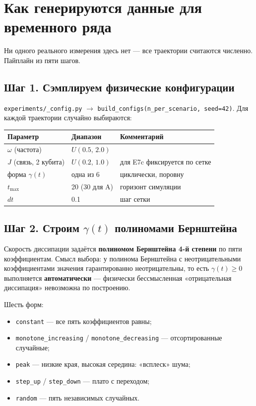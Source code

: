 \documentclass[12pt,a4paper]{article}
\newcommand{\code}[1]{\texttt{#1}}
\begin{document}
\section{Как генерируются данные для временного ряда}

Ни одного реального измерения здесь нет — все траектории считаются численно.
Пайплайн из пяти шагов.

\subsection{Шаг 1. Сэмплируем физические конфигурации}

\code{experiments/\_config.py} $\to$ \code{build\_configs(n\_per\_scenario,
seed=42)}. Для каждой траектории случайно выбираются:

\begin{center}
\begin{tabular}{@{}lll@{}}
\toprule
Параметр & Диапазон & Комментарий \\
\midrule
$\omega$ (частота) & $U(0.5,\,2.0)$ & \\
$J$ (связь, 2 кубита) & $U(0.2,\,1.0)$ & для E7c фиксируется по сетке \\
форма $\gamma(t)$ & одна из 6 & циклически, поровну \\
$t_{\max}$ & 20 (30 для A) & горизонт симуляции \\
$dt$ & 0.1 & шаг сетки \\
\bottomrule
\end{tabular}
\end{center}

\subsection{Шаг 2. Строим $\gamma(t)$ полиномами Бернштейна}

Скорость диссипации задаётся \textbf{полиномом Бернштейна 4-й степени} по пяти
коэффициентам. Смысл выбора: у полинома Бернштейна с неотрицательными
коэффициентами значения гарантированно неотрицательны, то есть
$\gamma(t)\geq 0$ выполняется \textbf{автоматически} — физически бессмысленная
«отрицательная диссипация» невозможна по построению.

Шесть форм:

\begin{itemize}
  \item \code{constant} — все пять коэффициентов равны;
  \item \code{monotone\_increasing} / \code{monotone\_decreasing} —
        отсортированные случайные;
  \item \code{peak} — низкие края, высокая середина: «всплеск» шума;
  \item \code{step\_up} / \code{step\_down} — плато с переходом;
  \item \code{random} — пять независимых случайных.
\end{itemize}
\end{document}
